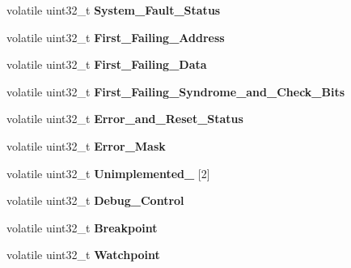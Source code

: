 \begin{DoxyCompactItemize}
volatile uint32\+\_\+t {\bfseries System\+\_\+\+Fault\+\_\+\+Status}
\item 
\mbox{\label{structERC32__Register__Map_aa0434dfc9202fc5108de9d8857ae2c42}} 
volatile uint32\+\_\+t {\bfseries First\+\_\+\+Failing\+\_\+\+Address}
\item 
\mbox{\label{structERC32__Register__Map_afc6da2dcfc708a140d470f9dc1190da9}} 
volatile uint32\+\_\+t {\bfseries First\+\_\+\+Failing\+\_\+\+Data}
\item 
\mbox{\label{structERC32__Register__Map_abbdc42fc0092a3861a7d00010a503580}} 
volatile uint32\+\_\+t {\bfseries First\+\_\+\+Failing\+\_\+\+Syndrome\+\_\+and\+\_\+\+Check\+\_\+\+Bits}
\item 
\mbox{\label{structERC32__Register__Map_a7d5dffd1d8eaaf90c82687b27b9377c8}} 
volatile uint32\+\_\+t {\bfseries Error\+\_\+and\+\_\+\+Reset\+\_\+\+Status}
\item 
\mbox{\label{structERC32__Register__Map_a40b9aa21875e73898c264d74c73742a5}} 
volatile uint32\+\_\+t {\bfseries Error\+\_\+\+Mask}
\item 
\mbox{\label{structERC32__Register__Map_a07285c03111737ac3b29e60fa4c3229f}} 
volatile uint32\+\_\+t {\bfseries Unimplemented\+\_} \mbox{[}2\mbox{]}
\item 
\mbox{\label{structERC32__Register__Map_acc4ab0ed70b1b67f94213a13276a4ec9}} 
volatile uint32\+\_\+t {\bfseries Debug\+\_\+\+Control}
\item 
\mbox{\label{structERC32__Register__Map_a4690eb68e1ece3094582797cedd26b20}} 
volatile uint32\+\_\+t {\bfseries Breakpoint}
\item 
\mbox{\label{structERC32__Register__Map_a15dab59631ff47ec7a2c73fead59eae7}} 
volatile uint32\+\_\+t {\bfseries Watchpoint}
\item 
\mbox{\label{structERC32__Register__Map_a6592ffe356d85e4e2773025525949a09}} 

\end{DoxyCompactItemize}
